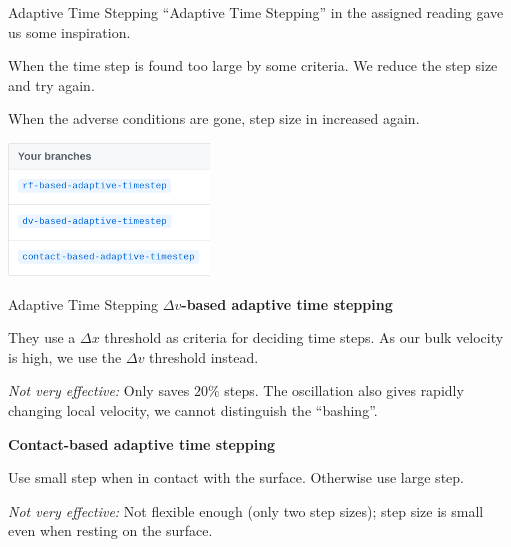\documentclass{beamer}
\begin{document}
	\begin{frame}{Adaptive Time Stepping}
		``Adaptive Time Stepping'' in the assigned reading gave us some inspiration.
		
		When the time step is found too large by some criteria. We reduce the step size and try again. 
		
		When the adverse conditions are gone, step size in increased again.
		
		\begin{center}
			\includegraphics[width=0.4\textwidth]{res/branches.png}
		\end{center}
	\end{frame}
	\begin{frame}{Adaptive Time Stepping}
		\textbf{$\Delta v$-based adaptive time stepping}
		
		They use a $\Delta x$ threshold as criteria for deciding time steps. As our bulk velocity is high, we use the $\Delta v$ threshold instead.
		
		\textit{Not very effective:} Only saves $20\%$ steps. The oscillation also gives rapidly changing local velocity, we cannot distinguish the ``bashing''. 
		
		\textbf{Contact-based adaptive time stepping}
		
		Use small step when in contact with the surface. Otherwise use large step.
		
		\textit{Not very effective:} Not flexible enough (only two step sizes); step size is small even when resting on the surface.
	\end{frame}
\end{document}
